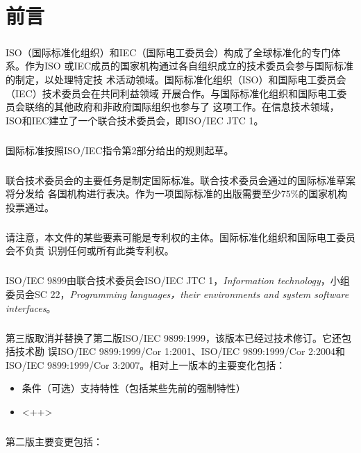 \chapter*{前言}

\paragraph{}
ISO（国际标准化组织）和IEC（国际电工委员会）构成了全球标准化的专门体系。作为ISO
或IEC成员的国家机构通过各自组织成立的技术委员会参与国际标准的制定，以处理特定技
术活动领域。国际标准化组织（ISO）和国际电工委员会（IEC）技术委员会在共同利益领域
开展合作。与国际标准化组织和国际电工委员会联络的其他政府和非政府国际组织也参与了
这项工作。在信息技术领域，ISO和IEC建立了一个联合技术委员会，即ISO/IEC JTC 1。

\paragraph{}
国际标准按照ISO/IEC指令第2部分给出的规则起草。

\paragraph{}
联合技术委员会的主要任务是制定国际标准。联合技术委员会通过的国际标准草案将分发给
各国机构进行表决。作为一项国际标准的出版需要至少$75\%$的国家机构投票通过。

\paragraph{}
请注意，本文件的某些要素可能是专利权的主体。国际标准化组织和国际电工委员会不负责
识别任何或所有此类专利权。

\paragraph{}
ISO/IEC 9899由联合技术委员会ISO/IEC JTC 1，\textit{Information technology}，小组
委员会SC 22，\textit{Programming languages，their environments and system
software interfaces}。

\paragraph{}
第三版取消并替换了第二版ISO/IEC 9899:1999，该版本已经过技术修订。它还包括技术勘
误ISO/IEC 9899:1999/Cor 1:2001、ISO/IEC 9899:1999/Cor 2:2004和
ISO/IEC 9899:1999/Cor 3:2007。相对上一版本的主要变化包括：
\begin{itemize}
  \item{条件（可选）支持特性（包括某些先前的强制特性）}
  \item{}<++>
\end{itemize}

\paragraph{}
第二版主要变更包括：
